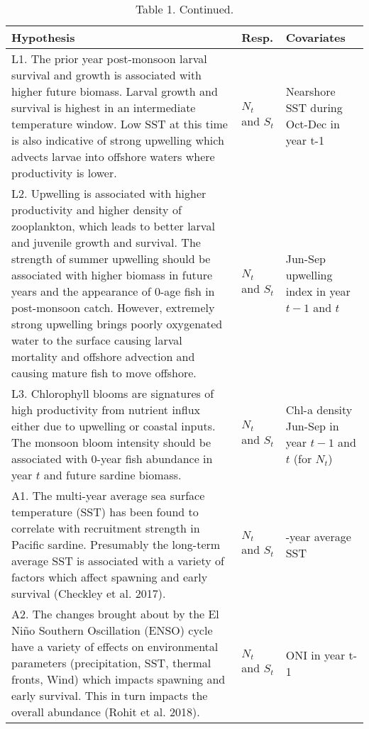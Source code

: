 \begin{table}[t]

\caption{\label{tab:unnamed-chunk-3}Table 1. Continued.}
\centering
\begin{tabular}{>{\raggedright\arraybackslash}p{8.5cm}|>{\raggedright\arraybackslash}p{1cm}|>{\raggedright\arraybackslash}p{3cm}}
\hline
Hypothesis & Resp. & Covariates\\
\hline
L1.  The prior year post-monsoon larval survival and growth is associated with higher future biomass. Larval growth and survival is highest in an intermediate temperature window. Low SST at this time is also indicative of strong upwelling which advects larvae into offshore waters where productivity is lower. & $N_t$ and $S_t$ & Nearshore SST during Oct-Dec in year t-1\\
\hline
L2. Upwelling is associated with higher productivity and higher density of zooplankton, which leads to better larval and juvenile growth and survival.  The strength of summer upwelling should be associated with higher biomass in future years and the appearance of 0-age fish in post-monsoon catch. However, extremely strong upwelling brings poorly oxygenated water to the surface causing larval mortality and offshore advection and causing mature fish to move offshore. & $N_t$ and $S_t$ & Jun-Sep upwelling index in year $t-1$ and $t$\\
\hline
L3. Chlorophyll blooms are signatures of high productivity from nutrient influx either due to upwelling or coastal inputs.  The monsoon bloom intensity should be associated with 0-year fish abundance in year $t$ and future sardine biomass. & $N_t$ and $S_t$ & Chl-a density Jun-Sep in year $t-1$ and $t$ (for $N_t$)\\
\hline
A1. The multi-year average sea surface temperature (SST) has been found to correlate with recruitment strength in Pacific sardine. Presumably the long-term average SST is associated with a variety of factors which affect spawning and early survival (Checkley et al. 2017). & $N_t$ and $S_t$ & 3-year average SST\\
\hline
A2. The changes brought about by the El Niño Southern Oscillation (ENSO) cycle have a variety of effects on environmental parameters (precipitation, SST, thermal fronts, Wind) which impacts spawning and early survival. This in turn impacts the overall abundance (Rohit et al. 2018). & $N_t$ and $S_t$ & ONI in year t-1\\
\hline
\end{tabular}
\end{table}


